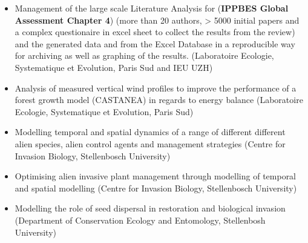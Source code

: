 \documentclass[a4paper]{article}
\begin{document}
\begin{itemize}[leftmargin=1.1in]
\item Management of the large scale Literature Analysis for
	(\textbf{IPPBES Global Assessment Chapter 4}) (more than 20 authors,
	> 5000 initial papers and a complex questionaire in excel sheet to
	collect the results from the review) and the generated data and from
	the Excel Database in a reproducible way for archiving as well as
	graphing of the results. (Laboratoire Ecologie, Systematique et Evolution, Paris
	Sud and IEU UZH)

\item Analysis of measured vertical wind profiles to improve the
	performance of a forest growth model (CASTANEA) in regards to energy
	balance (Laboratoire Ecologie, Systematique et Evolution, Paris
	Sud)

\item Modelling temporal and spatial dynamics of a range of different
	different alien species, alien control agents and management
	strategies (Centre for Invasion Biology, Stellenbosch
	University)

\item Optimising alien invasive plant management through modelling of
	temporal and spatial modelling (Centre for Invasion Biology,
	Stellenbosch University)

\item Modelling the role of seed dispersal in restoration and
	biological invasion (Department of Conservation Ecology and
	Entomology, Stellenbosh University)

\end{itemize}
\end{document}

